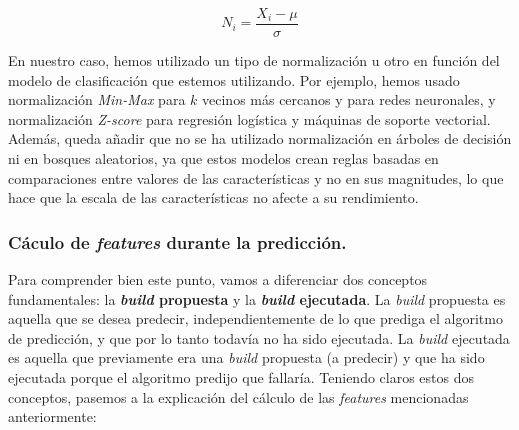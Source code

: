\begin{itemize}
\begin{enumerate}
        \begin{equation}
            N_{i} = \frac{X_{i} - \mu}{\sigma}
        \end{equation}
    \end{enumerate}

    En nuestro caso, hemos utilizado un tipo de normalización u otro en función del modelo de
    clasificación que estemos utilizando. Por ejemplo, hemos usado normalización \textit{Min-Max}
    para $k$ vecinos más cercanos y para redes neuronales, y normalización \textit{Z-score} para
    regresión logística y máquinas de soporte vectorial. Además, queda añadir que no se ha
    utilizado normalización en árboles de decisión ni en bosques aleatorios, ya que estos modelos
    crean reglas basadas en comparaciones entre valores de las características y no en sus
    magnitudes, lo que hace que la escala de las características no afecte a su rendimiento.
\end{itemize}

\subsubsection{Cáculo de \textit{features} durante la predicción.} Para comprender bien este
punto, vamos a diferenciar dos conceptos fundamentales: la \textbf{\textit{build} propuesta} y la
\textbf{\textit{build} ejecutada}. La \textit{build} propuesta es aquella que se desea predecir,
independientemente de lo que prediga el algoritmo de predicción, y que por lo tanto todavía no ha
sido ejecutada. La \textit{build} ejecutada es aquella que previamente era una \textit{build}
propuesta (a predecir) y que ha sido ejecutada porque el algoritmo predijo que fallaría. Teniendo
claros estos dos conceptos, pasemos a la explicación del cálculo de las \textit{features}
mencionadas anteriormente:

